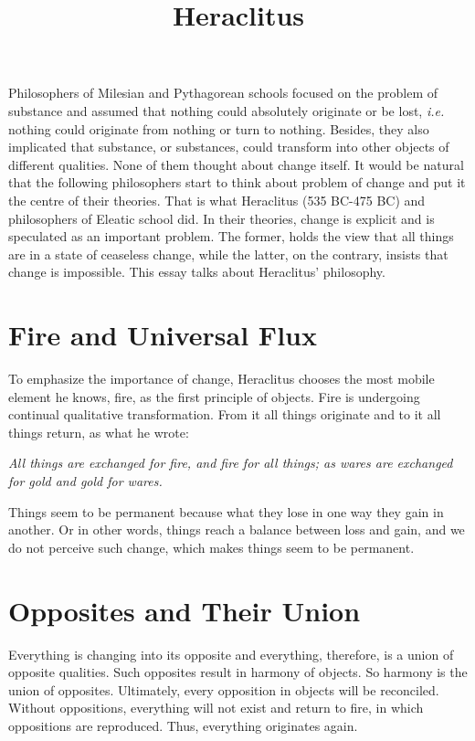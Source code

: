 \documentclass[11pt]{article}
\title{Heraclitus}
\date{}
\begin{document}
  \maketitle
  
  \newpage

  \linenumbers

Philosophers of Milesian and Pythagorean schools focused on the problem of substance and assumed that nothing could absolutely originate or be lost, \textit{i.e.} nothing could originate from nothing or turn to nothing. 
Besides, they also implicated that substance, or substances, could transform into other objects of different qualities. 
None of them thought about change itself. 
It would be natural that the following philosophers start to think about problem of change and put it the centre of their theories. 
That is what Heraclitus (535 BC-475 BC) and philosophers of Eleatic school did. 
In their theories, change is explicit and is speculated as an important problem. 
The former, holds the view that all things are in a state of ceaseless change, while the latter, on the contrary, insists that change is impossible. 
This essay talks about Heraclitus' philosophy.

\section{Fire and Universal Flux}
To emphasize the importance of change, Heraclitus chooses the most mobile element he knows, fire, as the first principle of objects. 
Fire is undergoing continual qualitative transformation. 
From it all things originate and to it all things return, as what he wrote:

\textit{All things are exchanged for fire, and fire for all things; as wares are exchanged for gold and gold for wares.}

\newline

Things seem to be permanent because what they lose in one way they gain in another. 
Or in other words, things reach a balance between loss and gain, and we do not perceive such change, which makes things seem to be permanent.

\section{Opposites and Their Union}
Everything is changing into its opposite and everything, therefore, is a union of opposite qualities. 
Such opposites result in harmony of objects. 
So harmony is the union of opposites. 
Ultimately, every opposition in objects will be reconciled. 
Without oppositions, everything will not exist and return to fire, in which oppositions are reproduced. 
Thus, everything originates again.
\end{document}
